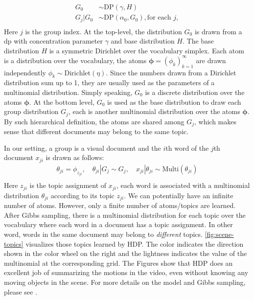 \begin{equation}    \label{eq:hdp}
\begin{aligned}    
    G_0 & \sim \text{DP}(\gamma, H) \\
    G_j|G_0 & \sim \text{DP}(\alpha_0, G_0), \text{for each } j,\\
\end{aligned}
\end{equation}
Here $j$ is the group index. At the top-level, the distribution $G_0$ is drawn from a \gls{dp} with concentration parameter $\gamma$ and base distribution $H$. 
The base distribution $H$ is a symmetric Dirichlet over the vocabulary simplex. 
Each atom is a distribution over the vocabulary, the atoms $\bm{\phi}=(\phi_k)^{\infty}_{k=1}$ are drawn independently $\phi_k \sim\text{Dirichlet}(\eta)$. Since the numbers drawn from a Dirichlet distribution sum up to 1, they are usually used as the parameters of a multinomial distribution. 
Simply speaking, $G_0$ is a discrete distribution over the atoms $\bm{\phi}$. 
At the bottom level, $G_0$ is used as the base distribution to draw each group distribution $G_j$, each is another multinomial distribution over the atoms $\bm{\phi}$. 
By such hierarchical definition, the atoms are shared among $G_j$, which makes sense that different documents may belong to the same topic.

In our setting, a group is a visual document and the $i$th word of the $j$th document $x_{ji}$ is drawn as follows:
\begin{equation}    \label{eq:multinomial}
\begin{aligned}
    \theta_{ji} = \phi_{z_{ji}}, \quad \theta_{ji}|G_j \sim G_j, \quad
    x_{ji}|\theta_{ji} \sim \text{Multi}(\theta_{ji})\\
\end{aligned}
\end{equation}
Here $z_{ji}$ is the topic assignment of $x_{ji}$, each word is associated with a multinomial distribution $\theta_{ji}$ according to its topic $z_{ji}$. 
We can potentially have an infinite number of atoms. However, only a finite number of atoms/topics are learned. 
After Gibbs sampling, there is a multinomial distribution for each topic over the vocabulary where each word in a document has a topic assignment. 
In other word, words in the same document may belong to  \emph{different} topics. \ref{fig:scene-topics} visualizes those topics learned by HDP. 
The color indicates the direction shown in the color wheel on the right and the lightness indicates the value of the multinomial at the corresponding grid. 
The Figures show that HDP does an excellent job of summarizing the motions in the video, even without knowing any moving objects in the scene. 
For more details on the model and Gibbs sampling, please see \cite{yee2006hierarchical}. 

